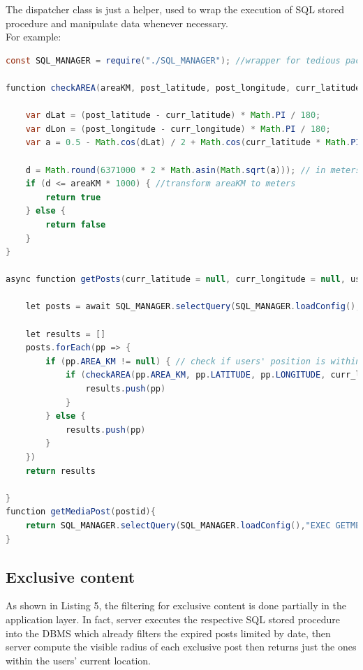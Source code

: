 \documentclass[conference]{IEEEtran}
\begin{document}
The dispatcher class is just a helper, used to wrap the execution of SQL stored procedure and manipulate data whenever necessary.
\\
For example:
\begin{lstlisting}[language=Java, caption=snippet example of dispatcher.js class]
const SQL_MANAGER = require("./SQL_MANAGER"); //wrapper for tedious package 

function checkAREA(areaKM, post_latitude, post_longitude, curr_latitude, curr_longitude) {

    var dLat = (post_latitude - curr_latitude) * Math.PI / 180;
    var dLon = (post_longitude - curr_longitude) * Math.PI / 180;
    var a = 0.5 - Math.cos(dLat) / 2 + Math.cos(curr_latitude * Math.PI / 180) * Math.cos(post_latitude * Math.PI / 180) * (1 - Math.cos(dLon)) / 2;

    d = Math.round(6371000 * 2 * Math.asin(Math.sqrt(a))); // in meters
    if (d <= areaKM * 1000) { //transform areaKM to meters
        return true
    } else {
        return false
    }
}

async function getPosts(curr_latitude = null, curr_longitude = null, username = null) {
   
    let posts = await SQL_MANAGER.selectQuery(SQL_MANAGER.loadConfig(), "EXEC GETPOSTS @USERNAME='" + username + "'")

    let results = []
    posts.forEach(pp => {
        if (pp.AREA_KM != null) { // check if users' position is within the post availability
            if (checkAREA(pp.AREA_KM, pp.LATITUDE, pp.LONGITUDE, curr_latitude, curr_longitude)) {
                results.push(pp)
            }
        } else {
            results.push(pp)
        }
    })
    return results

}
function getMediaPost(postid){
    return SQL_MANAGER.selectQuery(SQL_MANAGER.loadConfig(),"EXEC GETMEDIAPOST @POSTID="+postid)
}

\end{lstlisting}


\subsection{Exclusive content}\label{server:screening}

As shown in Listing 5, the filtering for exclusive content is done partially in the application layer.
In fact, server executes the respective SQL stored procedure into the DBMS which already filters the expired posts limited by date, then server compute the visible radius of each exclusive post then returns just the ones within the users' current location.
\end{document}
